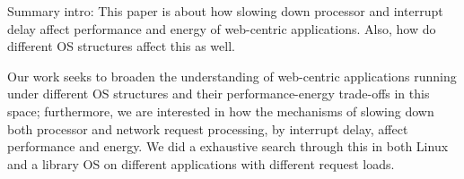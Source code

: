 



Summary intro: This paper is about how slowing down processor and interrupt delay affect performance and energy of web-centric applications. Also, how do different OS structures affect this as well.

Our work seeks to broaden the understanding of web-centric applications running under different OS structures and their performance-energy trade-offs in this space; furthermore, we are interested in how the mechanisms of slowing down both processor and network request processing, by interrupt delay, affect performance and energy. We did a exhaustive search through this in both Linux and a library OS on different applications with different request loads.

